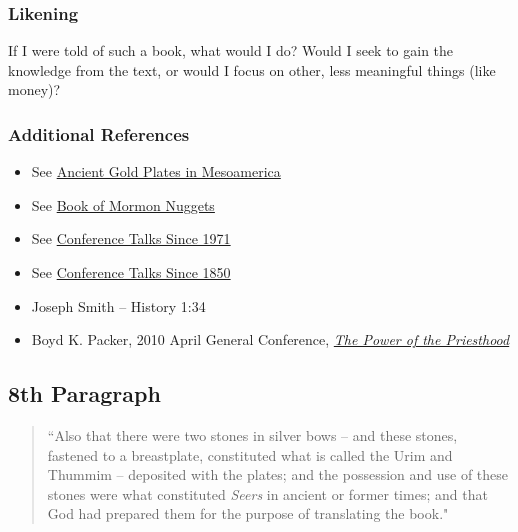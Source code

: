\documentclass[12pt]{report}
\begin{document}
\subsubsection{Likening\label{js:likening7}}
If I were told of such a book, what would I do?  Would I seek to gain the knowledge from the text, or would I focus on other, less meaningful things (like money)? 

\subsubsection{Additional References\label{js:references7}}
\begin{itemize}
\item See \href{http://www.deseretnews.com/article/705371752/Ancient-gold-plates-in-Mesoamerica.html}{Ancient Gold Plates in Mesoamerica}
\item See \href{http://www.jefflindsay.com/bme10.shtml}{Book of Mormon Nuggets}
\item See \href{https://www.lds.org/general-conference/conferences?lang=eng}{Conference Talks Since 1971}
\item See \href{http://www.lds-general-conference.org/}{Conference Talks Since 1850}
\item Joseph Smith -- History 1:34
\item Boyd K. Packer, 2010 April General Conference, \href{https://www.lds.org/general-conference/2010/04/the-power-of-the-priesthood?lang=eng}{\emph{The Power of the Priesthood}}
\end{itemize}

\subsection{8th Paragraph\label{js:8th}}
\begin{center}
\begin{quote}
``Also that there were two stones in silver bows -- and these stones, fastened to a breastplate, constituted what is called the Urim and Thummim -- deposited with the plates; and the possession and use of these stones were what constituted \emph{Seers} in ancient or former times; and that God had prepared them for the purpose of translating the book."
\end{quote}
\end{center}
\end{document}
